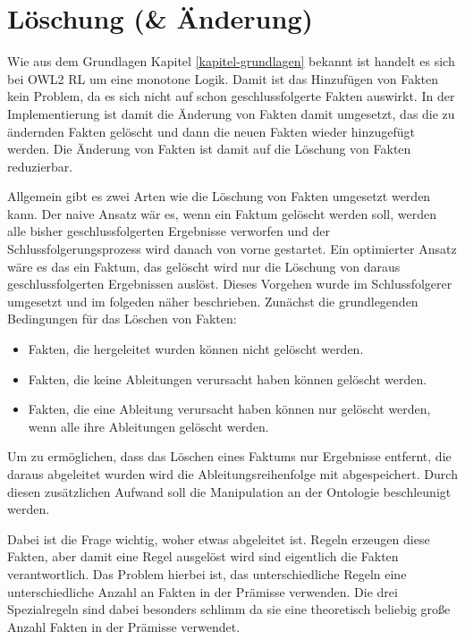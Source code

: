 \section{Löschung (\& Änderung)}

Wie aus dem Grundlagen Kapitel \ref{kapitel-grundlagen} bekannt ist handelt es sich bei OWL2 RL um eine monotone Logik. Damit ist das Hinzufügen von Fakten kein Problem, da es sich nicht auf schon geschlussfolgerte Fakten auswirkt. In der Implementierung ist damit die Änderung von Fakten damit umgesetzt, das die zu ändernden Fakten gelöscht und dann die neuen Fakten wieder hinzugefügt werden. Die Änderung von Fakten ist damit auf die Löschung von Fakten reduzierbar.

Allgemein gibt es zwei Arten wie die Löschung von Fakten umgesetzt werden kann. Der naive Ansatz wär es, wenn ein Faktum gelöscht werden soll, werden alle bisher geschlussfolgerten Ergebnisse verworfen und der Schlussfolgerungsprozess wird danach von vorne gestartet. Ein optimierter Ansatz wäre es das ein Faktum, das gelöscht wird nur die Löschung von daraus geschlussfolgerten Ergebnissen auslöst. Dieses Vorgehen wurde im Schlussfolgerer umgesetzt und im folgeden näher beschrieben. Zunächst die grundlegenden Bedingungen für das Löschen von Fakten:

\begin{itemize}
  \item Fakten, die hergeleitet wurden können nicht gelöscht werden.
  \item Fakten, die keine Ableitungen verursacht haben können gelöscht werden.
  \item Fakten, die eine Ableitung verursacht haben können nur gelöscht werden, wenn alle ihre Ableitungen gelöscht werden.
\end{itemize}

Um zu ermöglichen, dass das Löschen eines Faktums nur Ergebnisse entfernt, die daraus abgeleitet wurden wird die Ableitungsreihenfolge mit abgespeichert. Durch diesen zusätzlichen Aufwand soll die Manipulation an der Ontologie beschleunigt werden.

Dabei ist die Frage wichtig, woher etwas abgeleitet ist. Regeln erzeugen diese Fakten, aber damit eine Regel ausgelöst wird sind eigentlich die Fakten verantwortlich. Das Problem hierbei ist, das unterschiedliche Regeln eine unterschiedliche Anzahl an Fakten in der Prämisse verwenden. Die drei Spezialregeln sind dabei besonders schlimm da sie eine theoretisch beliebig große Anzahl Fakten in der Prämisse verwendet.

